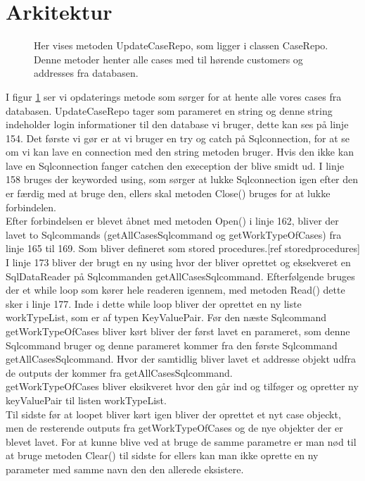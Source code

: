 \newpage
\section{Arkitektur}

\begin{figure}[H]
    \caption{Her vises metoden UpdateCaseRepo, som ligger i classen CaseRepo. Denne metoder henter alle cases med til hørende customers og addresses fra databasen.}
    \label{fig:UpdateCaseRepo}
\end{figure}

I figur \ref{fig:UpdateCaseRepo} ser vi opdaterings metode som sørger for at hente alle vores cases fra databasen. UpdateCaseRepo tager som parameret en string og denne string indeholder login informationer til den database vi bruger, dette kan ses på linje 154.
Det første vi gør er at vi bruger en try og catch på Sqlconnection, for at se om vi kan lave en connection med den string metoden bruger. Hvis den ikke kan lave en Sqlconnection fanger catchen den exeception der blive smidt ud. I linje 158 bruges der keyworded using, som sørger at lukke Sqlconnection igen efter den er færdig med at bruge den, ellers skal metoden Close() bruges for at lukke forbindelen.
\\
Efter forbindelsen er blevet åbnet med metoden Open() i linje 162, bliver der lavet to Sqlcommands (getAllCasesSqlcommand og getWorkTypeOfCases) fra linje 165 til 169. Som bliver defineret som stored procedures.[ref storedprocedures]
\\
I linje 173 bliver der brugt en ny using hvor der bliver oprettet og eksekveret en SqlDataReader på Sqlcommanden getAllCasesSqlcommand. Efterfølgende bruges der et while loop som kører hele readeren igennem, med metoden Read() dette sker i linje 177. Inde i dette while loop bliver der oprettet en ny liste workTypeList, som er af typen KeyValuePair.
Før den næste Sqlcommand getWorkTypeOfCases bliver kørt bliver der først lavet en parameret, som denne Sqlcommand bruger og denne parameret kommer fra den første Sqlcommand getAllCasesSqlcommand. Hvor der samtidlig bliver lavet et addresse objekt udfra de outputs der kommer fra getAllCasesSqlcommand.
\\
getWorkTypeOfCases bliver eksikveret hvor den går ind og tilføger og opretter ny keyValuePair til listen workTypeList.
\\
Til sidste før at loopet bliver kørt igen bliver der oprettet et nyt case objeckt, men de resterende outputs fra  getWorkTypeOfCases og de nye objekter der er blevet lavet.
For at kunne blive ved at bruge de samme parametre er man nød til at bruge metoden Clear() til sidste for ellers kan man ikke oprette en ny parameter med samme navn den den allerede eksistere.

